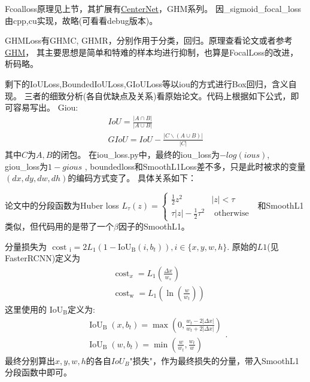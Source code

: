 \documentclass[UTF8]{ctexart}
\begin{document}
Fcoalloss原理见上节，其扩展有\href{https://arxiv.org/pdf/1904.07850.pdf}{CenterNet}，GHM系列。
因\_sigmoid\_focal\_loss由cpp,cu实现，故略(可看看debug版本)。 

GHMLoss有GHMC, GHMR，分别作用于分类，回归。原理查看论文或者参考\href{https://zhuanlan.zhihu.com/p/80594704}{GHM}，
其主要思想是简单和特难的样本均进行抑制，也算是FocalLoss的改进，析码略。

剩下的IoULoss,BoundedIoULoss,GIoULoss等以iou的方式进行Box回归，含义自现。
三者的细致分析(各自优缺点及关系)看原始论文。代码上根据如下公式，即可容易写出。
Giou:
\begin{equation*}
\begin{array}{l}
	I o U=\frac{|A \cap B|}{|A \cup B|} \\
	G I o U=I o U-\frac{|C \backslash(A \cup B)|}{|C|}
	\end{array}
\end{equation*}其中$C$为$A, B$的闭包。
在iou\_loss.py中，最终的iou\_loss为$-log(ious)$, giou\_loss为$1-gious$
, boundedloss和SmoothL1Loss差不多，只是此时被求的变量$(dx,dy,dw,dh)$的编码方式变了。
具体关系如下：

论文中的分段函数为Huber loss
$
L_{\tau}(z)=\left\{\begin{array}{cc}
	\frac{1}{2} z^{2} & |z|<\tau \\
	\tau|z|-\frac{1}{2} \tau^{2} & \text { otherwise }
	\end{array}\right.
$
和SmoothL1类似，但代码用的是带了一个$\beta$因子的SmoothL1。

分量损失为
$
\text { cost }_{\mathrm{i}}=
2 L_{1}\left(1-\mathrm{I} \mathrm{o} \mathrm{U}_{\mathrm{B}}\left(i, b_{t}\right)\right)
, i \in \{x, y, w, h\}.$
原始的$L1$(见FasterRCNN)定义为
$$
\begin{aligned}
	&\operatorname{cost}_{x}=L_{1}\left(\frac{\Delta x}{w_{s}}\right)\\
	&\operatorname{cost}_{\mathrm{w}}=L_{1}\left(\ln \left(\frac{w}{w_{t}}\right)\right)
	\end{aligned}
$$
这里使用的
$\mathrm{IoU}_{\mathrm{B}}$定义为:
$$
\begin{array}{l}
	\operatorname{IoU}_{\mathrm{B}}\left(x, b_{t}\right)=\max \left(0, \frac{w_{t}-2|\Delta x|}{w_{t}+2|\Delta x|}\right) \\
	\operatorname{IoU}_{\mathrm{B}}\left(w, b_{t}\right)=\min \left(\frac{w}{w_{t}}, \frac{w_{t}}{w}\right)
	\end{array}.
$$
最终分别算出$x,y,w,h$的各自$IoU_B$"损失"，作为最终损失的分量，带入SmoothL1分段函数中即可。
\end{document}
